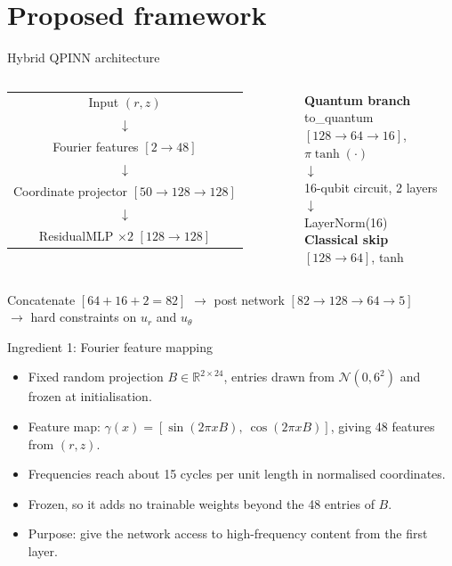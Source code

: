 \documentclass[aspectratio=169]{beamer}
\begin{document}
\section{Proposed framework}

\begin{frame}{Hybrid QPINN architecture}
\begin{columns}[T,onlytextwidth]
\centering
\begin{tabular}{c}
Input $(r,z)$ \\
$\downarrow$ \\
Fourier features $[2\to48]$ \\
$\downarrow$ \\
Coordinate projector $[50\to128\to128]$ \\
$\downarrow$ \\
ResidualMLP $\times 2$ $[128\to128]$ \\
\end{tabular}
\centering
\textbf{Quantum branch} \\
to\_quantum $[128\to64\to16]$, $\pi\tanh(\cdot)$ \\
$\downarrow$ \\
16-qubit circuit, 2 layers \\
$\downarrow$ \\
LayerNorm(16) \\[6pt]
\textbf{Classical skip} \\
$[128\to64]$, tanh
\end{columns}
\vspace{0.3cm}
\begin{center}
Concatenate $[64+16+2=82]$ $\rightarrow$ post network $[82\to128\to64\to5]$ \\
$\rightarrow$ hard constraints on $u_r$ and $u_\theta$
\end{center}
\end{frame}

\begin{frame}{Ingredient 1: Fourier feature mapping}
\begin{itemize}
  \item Fixed random projection $B \in \mathbb{R}^{2\times 24}$, entries drawn from $\mathcal{N}(0, 6^2)$ and frozen at initialisation.
  \item Feature map: $\gamma(x) = [\sin(2\pi xB),\ \cos(2\pi xB)]$, giving 48 features from $(r,z)$.
  \item Frequencies reach about 15 cycles per unit length in normalised coordinates.
  \item Frozen, so it adds no trainable weights beyond the 48 entries of $B$.
  \item Purpose: give the network access to high-frequency content from the first layer.
\end{itemize}
\end{frame}
\end{document}
